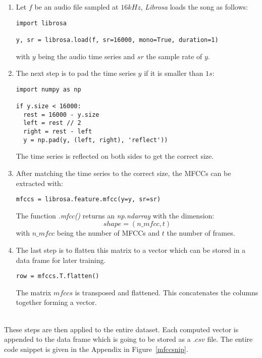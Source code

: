 \begin{enumerate}[label=\arabic*.]
  \item Let $f$ be an audio file sampled at $16kHz$, \textit{Librosa} loads the
song as follows:
\begin{lstlisting}
import librosa

y, sr = librosa.load(f, sr=16000, mono=True, duration=1)
\end{lstlisting}
with $y$ being the audio time series and $sr$ the sample rate of $y$.\\
\item The next step is to pad the time series $y$ if it is smaller than $1s$:
\begin{lstlisting}
import numpy as np

if y.size < 16000:
  rest = 16000 - y.size
  left = rest // 2
  right = rest - left
  y = np.pad(y, (left, right), 'reflect'))
\end{lstlisting}
The time series is reflected on both sides to get the correct size.\\
\item After matching the time series to the correct size, the MFCCs can be extracted
with:
\begin{lstlisting}
mfccs = librosa.feature.mfcc(y=y, sr=sr)
\end{lstlisting}
The function \textit{.mfcc()} returns an \textit{np.ndarray} with the dimension:
\begin{equation*}
  shape=(n\_mfcc,t) 
\end{equation*}
with $n\_mfcc$ being the number of MFCCs and $t$ the number of frames.
\item The last step is to flatten this matrix to a vector which can be stored in a
  data frame for later training.
\begin{lstlisting}
row = mfccs.T.flatten() 
\end{lstlisting}
The matrix $mfccs$ is transposed and flattened. This concatenates the columns
together forming a vector.
\end{enumerate}~\\
These steps are then applied to the entire dataset. Each computed vector is
appended to the data frame which is going to be stored as a $.csv$ file. The
entire code snippet is given in the Appendix in Figure~\ref{mfccsnip}.
